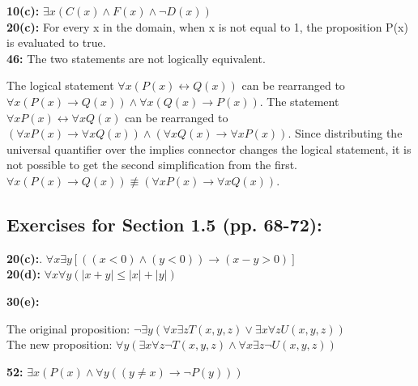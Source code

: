\documentclass[12pt]{article}  %
\newcommand{\NOT}{\neg}
\newcommand{\AND}{\wedge}
\newcommand{\OR}{\vee}
\newcommand{\IMPLIES}{\rightarrow}
\newcommand{\IFF}{\leftrightarrow}
\begin{document}
\noindent
{\bf 10(c):} $\exists x(C(x) \AND F(x) \AND \NOT D(x))$\\

\noindent
{\bf 20(c):} For every x in the domain, when x is not equal to 1, the proposition P(x) is evaluated to true.\\

\noindent
{\bf 46:} The two statements are not logically equivalent.

The logical statement $\forall x(P(x) \IFF Q(x))$ can be rearranged to $\forall x (P(x) \IMPLIES Q(x)) \AND \forall x (Q(x) \IMPLIES P(x))$. The statement $\forall x P(x) \IFF \forall x Q(x)$ can be rearranged to $(\forall x P(x) \IMPLIES \forall x Q(x)) \AND (\forall x Q(x) \IMPLIES \forall x P(x))$. Since distributing the universal quantifier over the implies connector changes the logical statement, it is not possible to get the second simplification from the first. $\forall x (P(x) \IMPLIES Q(x)) \not\equiv (\forall x P(x) \IMPLIES \forall x Q(x))$.


\subsection*{Exercises for Section 1.5 (pp. 68-72):}     

\noindent
{\bf 20(c):}. $\forall x \exists y [((x < 0) \AND (y < 0)) \IMPLIES (x - y > 0)]$\\

\noindent
{\bf 20(d):} $\forall x \forall y (|x + y| \leq |x|+|y|)$

\noindent
{\bf 30(e):}

The original proposition: $\NOT \exists y (\forall x \exists z T(x, y, z) \OR \exists x \forall z U(x, y, z))$ \\
\indent
The new proposition: $\forall y (\exists x \forall z \NOT T(x, y, z) \AND \forall x \exists z \NOT U(x, y, z))$

\noindent
{\bf 52:} $\exists x (P(x) \AND \forall y (( y \neq x) \IMPLIES \NOT P(y)))$\\
\end{document}
